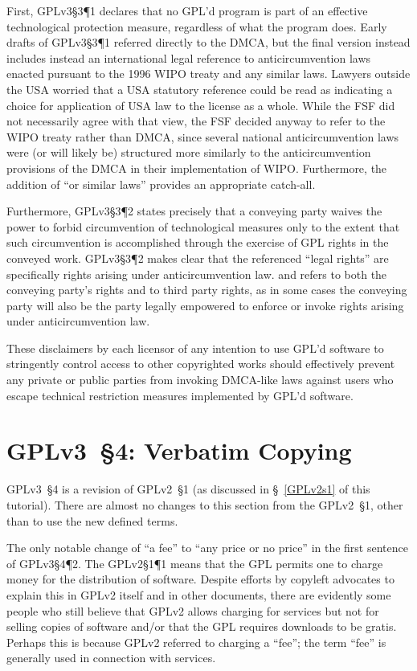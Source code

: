 First, GPLv3\S3\P1 declares that no GPL'd program is part of an effective
technological protection measure, regardless of what the program does.  Early
drafts of GPLv3\S3\P1 referred directly to the DMCA, but the final version
instead includes instead an international legal reference to
anticircumvention laws enacted pursuant to the 1996 WIPO treaty and any
similar laws.  Lawyers outside the USA worried that a USA statutory reference
could be read as indicating a choice for application of USA law to the
license as a whole.  While the FSF did not necessarily agree with that view,
the FSF decided anyway to refer to the WIPO treaty rather than DMCA, since
several national anticircumvention laws were (or will likely be) structured
more similarly to the anticircumvention provisions of the DMCA in their
implementation of WIPO\@.  Furthermore, the addition of ``or similar laws''
provides an appropriate catch-all.

Furthermore, GPLv3\S3\P2 states precisely that a conveying party waives the
power to forbid circumvention of technological measures only to the extent
that such circumvention is accomplished through the exercise of GPL rights in
the conveyed work.  GPLv3\S3\P2 makes clear that the referenced ``legal
rights'' are specifically rights arising under anticircumvention law.  and
refers to both the conveying party's rights and to third party rights, as in
some cases the conveying party will also be the party legally empowered to
enforce or invoke rights arising under anticircumvention law.

These disclaimers by each licensor of any intention to use GPL'd software to
stringently control access to other copyrighted works should effectively
prevent any private or public parties from invoking DMCA-like laws against
users who escape technical restriction measures implemented by GPL'd
software.

\section{GPLv3~\S4: Verbatim Copying}
\label{GPLv3s4}

GPLv3~\S4 is a revision of GPLv2~\S1 (as discussed in \S~\ref{GPLv2s1} of
this tutorial).   There are almost no changes to this section from the
GPLv2~\S1, other than to use the new defined terms.

The only notable change of ``a fee'' to ``any price or no price'' in the
first sentence of GPLv3\S4\P2.  The GPLv2\S1\P1 means that the GPL permits
one to charge money for the distribution of software.  Despite efforts by
copyleft advocates to explain this in GPLv2 itself and in other documents,
there are evidently some people who still believe that GPLv2 allows charging
for services but not for selling copies of software and/or that the GPL
requires downloads to be gratis.  Perhaps this is because GPLv2 referred to
charging a ``fee''; the term ``fee'' is generally used in connection with
services.

